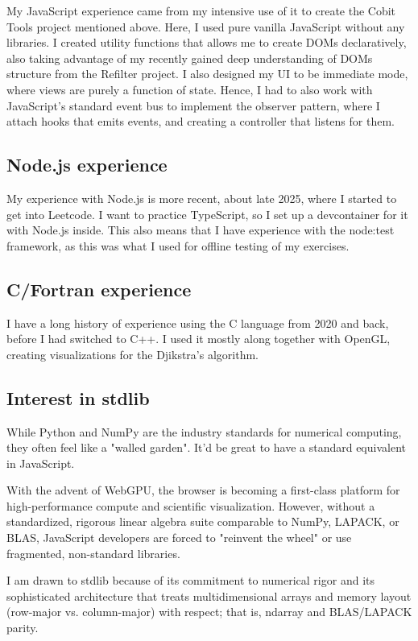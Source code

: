 \documentclass[
	a4paper,
	12pt
]{article}
\begin{document}
My JavaScript experience came from my intensive use of it to create the Cobit Tools project mentioned above. Here, I used pure vanilla JavaScript without any libraries. I created utility functions that allows me to create DOMs declaratively, also taking advantage of my recently gained deep understanding of DOMs structure from the Refilter project. I also designed my UI to be immediate mode, where views are purely a function of state. Hence, I had to also work with JavaScript's standard event bus to implement the observer pattern, where I attach hooks that emits events, and creating a controller that listens for them.

\subsection{Node.js experience}

My experience with Node.js is more recent, about late 2025, where I started to get into Leetcode. I want to practice TypeScript, so I set up a devcontainer for it with Node.js inside. This also means that I have experience with the node:test framework, as this was what I used for offline testing of my exercises.

\subsection{C/Fortran experience}

I have a long history of experience using the C language from 2020 and back, before I had switched to C++. I used it mostly along together with OpenGL, creating visualizations for the Djikstra's algorithm.

\subsection{Interest in stdlib}

While Python and NumPy are the industry standards for numerical computing, they often feel like a "walled garden". It'd be great to have a standard equivalent in JavaScript.

With the advent of WebGPU, the browser is becoming a first-class platform for high-performance compute and scientific visualization. However, without a standardized, rigorous linear algebra suite comparable to NumPy, LAPACK, or BLAS, JavaScript developers are forced to "reinvent the wheel" or use fragmented, non-standard libraries.

I am drawn to stdlib because of its commitment to numerical rigor and its sophisticated architecture that treats multidimensional arrays and memory layout (row-major vs. column-major) with respect; that is, ndarray and BLAS/LAPACK parity.
\end{document}
